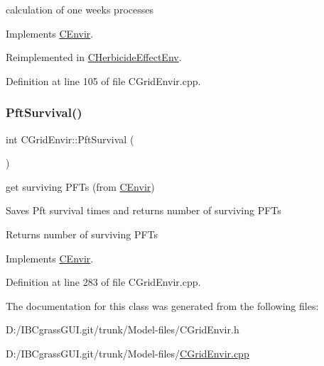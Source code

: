 calculation of one week\textquotesingle{}s processes 

Implements \mbox{\hyperlink{class_c_envir_aaf79409fdf193613b40fb45a66dba4ee}{C\+Envir}}.



Reimplemented in \mbox{\hyperlink{class_c_herbicide_effect_env_a82fba7cb44890dd47d5e594f72803241}{C\+Herbicide\+Effect\+Env}}.



Definition at line 105 of file C\+Grid\+Envir.\+cpp.

\mbox{\label{class_c_grid_envir_aed2b467efa481b601ef4147cc990debc}} 
\subsubsection{\texorpdfstring{PftSurvival()}{PftSurvival()}}
{\footnotesize\ttfamily int C\+Grid\+Envir\+::\+Pft\+Survival (\begin{DoxyParamCaption}{ }\end{DoxyParamCaption})\hspace{0.3cm}{\ttfamily [virtual]}}



get surviving P\+F\+Ts (from \mbox{\hyperlink{class_c_envir}{C\+Envir}}) 

Saves Pft survival times and returns number of surviving P\+F\+Ts \begin{DoxyReturn}{Returns}
number of surviving P\+F\+Ts 
\end{DoxyReturn}


Implements \mbox{\hyperlink{class_c_envir_a03a7a06d46020790e16f68e52469471a}{C\+Envir}}.



Definition at line 283 of file C\+Grid\+Envir.\+cpp.



The documentation for this class was generated from the following files\+:\begin{DoxyCompactItemize}
\item 
D\+:/\+I\+B\+Cgrass\+G\+U\+I.\+git/trunk/\+Model-\/files/C\+Grid\+Envir.\+h\item 
D\+:/\+I\+B\+Cgrass\+G\+U\+I.\+git/trunk/\+Model-\/files/\mbox{\hyperlink{_c_grid_envir_8cpp}{C\+Grid\+Envir.\+cpp}}\end{DoxyCompactItemize}
